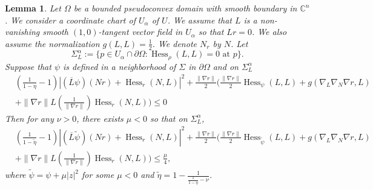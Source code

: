 \documentclass[11pt]{article}
\theoremstyle{plain} \numberwithin{equation}{section}
\newtheorem{lemma}[theorem]{Lemma}
\theoremstyle{definition}
\DeclareMathOperator{\Hessian}{Hess}
\begin{document}
\begin{lemma}
	Let $\Omega$ be a bounded pseudoconvex domain with smooth boundary in $\mathbb{C}^n$. We consider a coordinate chart of $U_\alpha$ of $U$. We assume that $L$ is a non-vanishing smooth $(1,0)$-tangent vector field in $U_\alpha$ so that $Lr=0$. We also assume the normalization $g(L, L)=\frac{1}{2}$. We denote $N_r$ by $N$. Let \[\Sigma^\alpha_L:=\lbrace p\in U_\alpha\cap\partial\Omega: \Hessian_\rho(L, L)=0 \text{  at  } p\rbrace.\] Suppose that $\psi$ is defined in a neighborhood of $\Sigma$ in $\partial\Omega$ and on $\Sigma^\alpha_L$
	\[\begin{split}
	&\left(\frac{1}{1-\eta}-1\right)\left|(\overline{L}\psi)(Nr)+\Hessian_r(N, L)\right|^2+\frac{\|\nabla r\|}{2}\Bigg(\frac{\|\nabla r\|}{2}\Hessian_\psi(L, L)+g(\nabla_L\nabla_N\nabla r, L)\\&+\|\nabla r\|L\left(\frac{1}{\|\nabla r\|}\right)\Hessian_r(N, L)\Bigg)\leq 0	 \end{split}
	\]  Then for any $\nu>0$, there exists $\mu<0$ so that on $\Sigma^\alpha_L$,
	\[\begin{split}
	&\left(\frac{1}{1-\tilde{\eta}}-1\right)\left|(\overline{L}\tilde{\psi})(Nr)+\Hessian_r(N, L)\right|^2+\frac{\|\nabla r\|}{2}\Bigg(\frac{\|\nabla r\|}{2}\Hessian_{\tilde{\psi}}(L, L)+g(\nabla_L\nabla_N\nabla r, L)\\&+\|\nabla r\|L\left(\frac{1}{\|\nabla r\|}\right)\Hessian_r(N, L)\Bigg)\leq \frac{\mu}{4},
	\end{split}\] where $\tilde{\psi}=\psi+\mu|z|^2$ for some $\mu<0$ and $\tilde{\eta}=1-\frac{1}{\frac{1}{1-\eta}-\nu}$.
\end{lemma}
\end{document}
